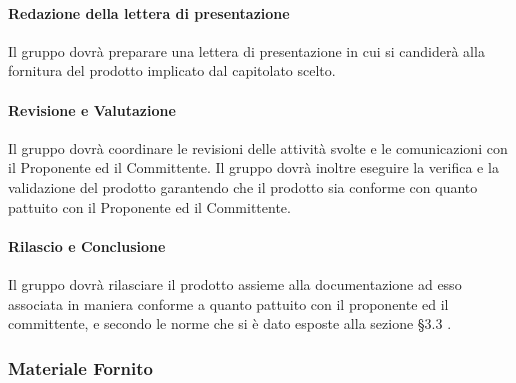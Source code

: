             \paragraph{Redazione della lettera di presentazione}
                Il gruppo dovrà preparare una lettera di presentazione in cui si candiderà alla fornitura del prodotto implicato dal capitolato scelto.\\
            \paragraph{Revisione e Valutazione}
                Il gruppo dovrà coordinare le revisioni delle attività svolte e le comunicazioni con il Proponente ed il Committente. Il gruppo dovrà inoltre eseguire la verifica e la validazione del prodotto garantendo che il prodotto sia conforme con quanto pattuito con il Proponente ed il Committente.\\
            \paragraph{Rilascio e Conclusione}
                Il gruppo dovrà rilasciare il prodotto assieme alla documentazione ad esso associata in maniera conforme a quanto pattuito con il proponente ed il committente, e secondo le norme che si è dato esposte alla sezione §3.3 .\\
        
        \subsubsection{Materiale Fornito}
